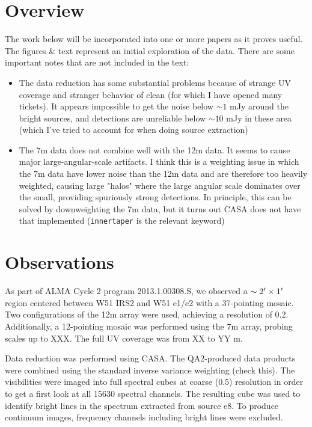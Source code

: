 \documentclass{aa}
\begin{document}
\section{Overview}
The work below will be incorporated into one or more papers as it proves useful.
The figures \& text represent an initial exploration of the data.  There are some important notes
that are not included in the text:
\begin{itemize}
    \item The data reduction has some substantial problems because of strange UV coverage
        and stranger behavior of clean (for which I have opened many tickets).  It appears
        impossible to get the noise below $\sim1 $ mJy around the bright sources, and detections
        are unreliable below $\sim10$ mJy in these area (which I've tried to account for when doing
        source extraction)
    \item The 7m data does not combine well with the 12m data.  It seems to
        cause major large-angular-scale artifacts.  I think this is a weighting
        issue in which the 7m data have lower noise than the 12m data and are
        therefore too heavily weighted, causing large "halos" where the large
        angular scale dominates over the small, providing spuriously strong
        detections.  In principle, this can be solved by downweighting the 7m data,
        but it turns out CASA does not have that implemented (\texttt{innertaper}
        is the relevant keyword)

\end{itemize}


\section{Observations}
As part of ALMA Cycle 2 program 2013.1.00308.S, we observed a
$\sim2\mbox{$^\prime$}\times1\mbox{$^\prime$}$ region centered between W51 IRS2 and W51 e1/e2
with a 37-pointing mosaic.  Two configurations of the 12m array were used,
achieving a resolution of 0.2\arcsec.  Additionally, a 12-pointing mosaic was
performed using the 7m array, probing scales up to XXX\arcsec.  The full UV
coverage was from XX to YY m.

Data reduction was performed using CASA.  The QA2-produced data products were
combined using the standard inverse variance weighting (check this).
The visibilities were imaged into full spectral cubes at coarse (0.5\arcsec)
resolution in order to get a first look at all 15630 spectral channels.  The
resulting cube was used to identify bright lines in the spectrum extracted
from source e8.  To produce continuum images, frequency channels including
bright lines were excluded.
\end{document}
